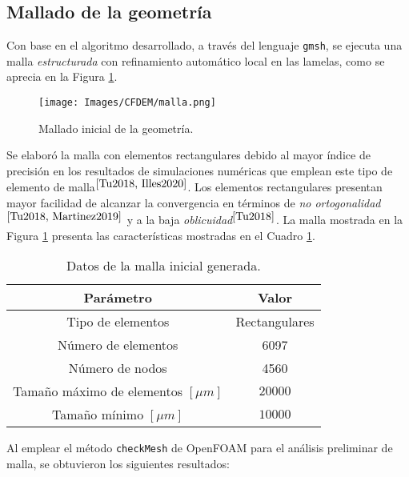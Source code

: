 \subsection{Mallado de la geometr\'ia}

\noindent
\justify

Con base en el algoritmo desarrollado, a trav\'es del lenguaje \texttt{gmsh}, se ejecuta una malla \textit{estructurada} con refinamiento autom\'atico local en las lamelas, como se aprecia en la Figura \ref{malla:geo}.

\begin{figure}[h!]
	\centering
	\texttt{[image: Images/CFDEM/malla.png]}
	\caption{Mallado inicial de la geometr\'ia.}
	\label{malla:geo}
\end{figure}

\noindent
\justify

Se elabor\'o la malla con elementos rectangulares debido al mayor \'indice de precisi\'on en los resultados de simulaciones num\'ericas que emplean este tipo de elemento de malla$^{\cite{Tu2018, Illes2020}}$. Los elementos rectangulares presentan mayor facilidad de alcanzar la convergencia en t\'erminos de \textit{no ortogonalidad}$^{\cite{Tu2018, Martinez2019}}$ y a la baja \textit{oblicuidad}$^{\cite{Tu2018}}$. La malla mostrada en la Figura \ref{malla:geo} presenta las caracter\'isticas mostradas en el Cuadro \ref{malla}.

\begin{table}[h!]
	\centering
	\begin{tabular}{|c|c|}
		\hline
		\textbf{Par\'ametro} & \textbf{Valor} \\ \hline
		Tipo de elementos & Rectangulares \\ \hline
		N\'umero de elementos & 6097 \\ \hline
		N\'umero de nodos & 4560 \\ \hline
		Tama\~no m\'aximo de elementos $[\mu m]$ & $20000$ \\ \hline
		Tama\~no m\'inimo $[\mu m]$ & $10000$ \\ \hline	
	\end{tabular}
	\caption{Datos de la malla inicial generada.}
	\label{malla}
\end{table}

\newpage

\noindent
\justify

Al emplear el m\'etodo \texttt{checkMesh} de OpenFOAM para el an\'alisis preliminar de malla, se obtuvieron los siguientes resultados:

